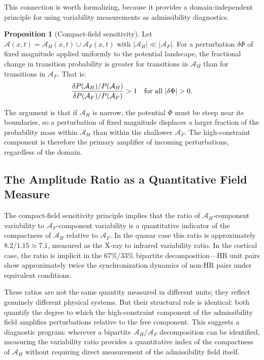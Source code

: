 \documentclass[12pt, a4paper]{article}
\DeclarePairedDelimiter{\abs}{\lvert}{\rvert}
\theoremstyle{definition}
\newtheorem{prop}{Proposition}[section]
\begin{document}
This connection is worth formalizing, because it provides a domain-independent principle for using variability measurements as admissibility diagnostics.

\begin{prop}[Compact-field sensitivity]
Let $\mathcal{A}(x,t) = \mathcal{A}_H(x,t) \cup \mathcal{A}_F(x,t)$ with $|\mathcal{A}_H| \ll |\mathcal{A}_F|$. For a perturbation $\delta\Phi$ of fixed magnitude applied uniformly to the potential landscape, the fractional change in transition probability is greater for transitions in $\mathcal{A}_H$ than for transitions in $\mathcal{A}_F$. That is:
\begin{equation}
\frac{\delta P(\mathcal{A}_H) / P(\mathcal{A}_H)}{\delta P(\mathcal{A}_F) / P(\mathcal{A}_F)} > 1 \quad \text{for all } \abs{\delta\Phi} > 0.
\end{equation}
\end{prop}

The argument is that if $\mathcal{A}_H$ is narrow, the potential $\Phi$ must be steep near its boundaries, so a perturbation of fixed magnitude displaces a larger fraction of the probability mass within $\mathcal{A}_H$ than within the shallower $\mathcal{A}_F$. The high-constraint component is therefore the primary amplifier of incoming perturbations, regardless of the domain.

\subsection{The Amplitude Ratio as a Quantitative Field Measure}

The compact-field sensitivity principle implies that the ratio of $\mathcal{A}_H$-component variability to $\mathcal{A}_F$-component variability is a quantitative indicator of the compactness of $\mathcal{A}_H$ relative to $\mathcal{A}_F$. In the quasar case this ratio is approximately $8.2 / 1.15 \approx 7.1$, measured as the X-ray to infrared variability ratio. In the cortical case, the ratio is implicit in the 67\%/33\% bipartite decomposition---HR unit pairs show approximately twice the synchronization dynamics of non-HR pairs under equivalent conditions.

These ratios are not the same quantity measured in different units; they reflect genuinely different physical systems. But their structural role is identical: both quantify the degree to which the high-constraint component of the admissibility field amplifies perturbations relative to the free component. This suggests a diagnostic program: wherever a bipartite $\mathcal{A}_H / \mathcal{A}_F$ decomposition can be identified, measuring the variability ratio provides a quantitative index of the compactness of $\mathcal{A}_H$ without requiring direct measurement of the admissibility field itself.
\end{document}

